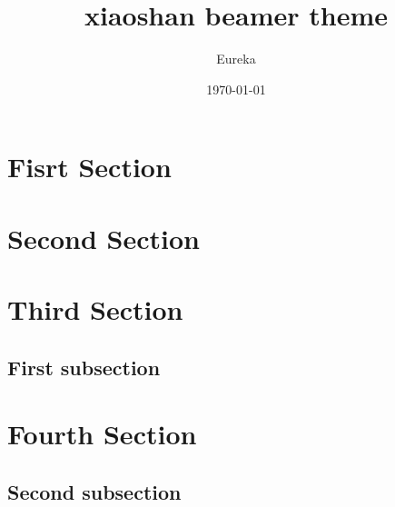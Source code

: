 \documentclass[layout={slide=true, theme=AnnArborSpruce}]{ztex}
\title{xiaoshan beamer theme}
\author{Eureka}
\date{\today}
\begin{document}
\maketitle


\section{Fisrt Section}
\lipsum[1][1-3]

\section{Second Section}
\lipsum[1][1-3]

\section{Third Section}
\subsection{First subsection}
\lipsum[2][1-4]

\section{Fourth Section}
\lipsum[3][1-4]
\subsection{Second subsection}
\lipsum[3][1-4]
\end{document}

